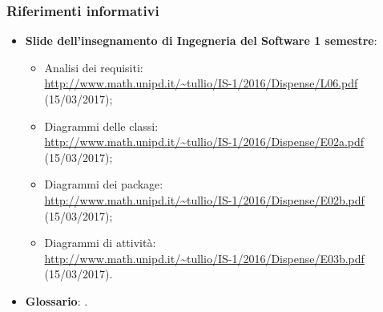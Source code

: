 \documentclass[../AnalisiDeiRequisiti.tex]{subfiles}
\begin{document}
			\subsubsection{Riferimenti informativi}	
				\begin{itemize}
					\item \textbf{Slide dell'insegnamento di Ingegneria del Software
					1 semestre}:
						\begin{itemize}
							\item Analisi dei requisiti:\\
							\url{http://www.math.unipd.it/~tullio/IS-1/2016/Dispense/L06.pdf} (15/03/2017);
							\item Diagrammi delle classi:\\
							\url{http://www.math.unipd.it/~tullio/IS-1/2016/Dispense/E02a.pdf} (15/03/2017);
							\item Diagrammi dei package:\\
							\url{http://www.math.unipd.it/~tullio/IS-1/2016/Dispense/E02b.pdf} (15/03/2017);
							\item Diagrammi di attività:\\
							\url{http://www.math.unipd.it/~tullio/IS-1/2016/Dispense/E03b.pdf} (15/03/2017).
						\end{itemize}
					\item \textbf{Glossario}: \glossariov.
				\end{itemize}
\end{document}
